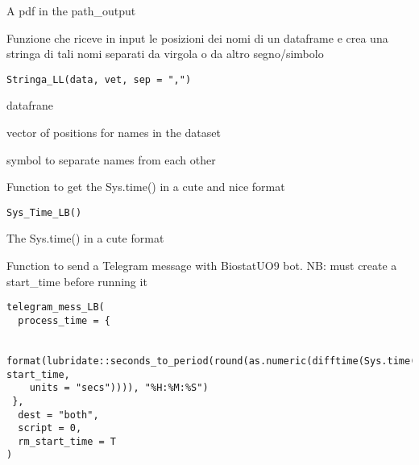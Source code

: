 \documentclass[a4paper]{book}
\begin{document}
%
\begin{Value}
A pdf in the path\_output
\end{Value}
%
\begin{Description}
Funzione che riceve in input le posizioni dei nomi di un dataframe e crea una stringa di tali nomi separati da virgola o da altro segno/simbolo
\end{Description}
%
\begin{Usage}
\begin{verbatim}
Stringa_LL(data, vet, sep = ",")
\end{verbatim}
\end{Usage}
%
\begin{Arguments}
\begin{ldescription}
\item[\code{data}] datafrane

\item[\code{vet}] vector of positions for names in the dataset

\item[\code{sep}] symbol to separate names from each other
\end{ldescription}
\end{Arguments}
%
\begin{Description}
Function to get the Sys.time() in a cute and nice format
\end{Description}
%
\begin{Usage}
\begin{verbatim}
Sys_Time_LB()
\end{verbatim}
\end{Usage}
%
\begin{Value}
The Sys.time() in a cute format
\end{Value}
%
\begin{Description}
Function to send a Telegram message with BiostatUO9 bot. NB: must create a start\_time before running it
\end{Description}
%
\begin{Usage}
\begin{verbatim}
telegram_mess_LB(
  process_time = {
    
    format(lubridate::seconds_to_period(round(as.numeric(difftime(Sys.time(), start_time,
    units = "secs")))), "%H:%M:%S")
 },
  dest = "both",
  script = 0,
  rm_start_time = T
)
\end{verbatim}
\end{Usage}
\end{document}

